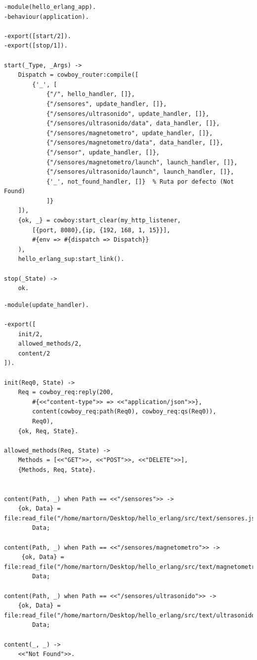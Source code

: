 \vspace{10mm}

\lstset{language=Erlang, breaklines=true, basicstyle=\sffamily\footnotesize}
\begin{lstlisting}[frame=single, caption=hello\_erlang\_app.erl]
-module(hello_erlang_app).
-behaviour(application).

-export([start/2]).
-export([stop/1]).

start(_Type, _Args) ->
    Dispatch = cowboy_router:compile([
        {'_', [
			{"/", hello_handler, []},
			{"/sensores", update_handler, []},
			{"/sensores/ultrasonido", update_handler, []},
			{"/sensores/ultrasonido/data", data_handler, []},
			{"/sensores/magnetometro", update_handler, []},
			{"/sensores/magnetometro/data", data_handler, []},
			{"/sensor", update_handler, []},
			{"/sensores/magnetometro/launch", launch_handler, []},
			{"/sensores/ultrasonido/launch", launch_handler, []},
			{'_', not_found_handler, []}  % Ruta por defecto (Not Found)
			]}
    ]),
    {ok, _} = cowboy:start_clear(my_http_listener,
        [{port, 8080},{ip, {192, 168, 1, 15}}],
        #{env => #{dispatch => Dispatch}}
    ),
    hello_erlang_sup:start_link().
    
stop(_State) ->
	ok.
\end{lstlisting}

\vspace{10mm}

\lstset{language=Erlang, breaklines=true, basicstyle=\sffamily\footnotesize}
\begin{lstlisting}[frame=single, caption=update\_handler.erl]
-module(update_handler).

-export([
    init/2,
    allowed_methods/2,
    content/2
]).

init(Req0, State) ->
    Req = cowboy_req:reply(200,
        #{<<"content-type">> => <<"application/json">>},
        content(cowboy_req:path(Req0), cowboy_req:qs(Req0)),
        Req0),
    {ok, Req, State}.

allowed_methods(Req, State) ->
    Methods = [<<"GET">>, <<"POST">>, <<"DELETE">>],
    {Methods, Req, State}.
    
    
content(Path, _) when Path == <<"/sensores">> ->
    {ok, Data} = file:read_file("/home/martorn/Desktop/hello_erlang/src/text/sensores.json"),
        Data;

content(Path, _) when Path == <<"/sensores/magnetometro">> ->
     {ok, Data} = file:read_file("/home/martorn/Desktop/hello_erlang/src/text/magnetometro.json"),
        Data;

content(Path, _) when Path == <<"/sensores/ultrasonido">> ->
    {ok, Data} = file:read_file("/home/martorn/Desktop/hello_erlang/src/text/ultrasonido.json"),
        Data;
                
content(_, _) ->
    <<"Not Found">>.
\end{lstlisting}

